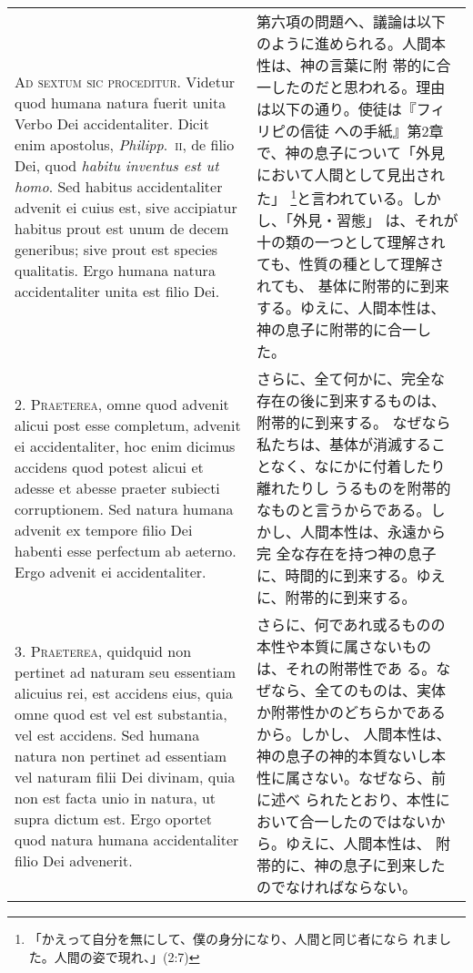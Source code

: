 \documentclass[10pt]{jsarticle} %
\begin{document}
\begin{longtable}{p{21em}p{21em}}
{\scshape Ad sextum sic proceditur}. Videtur quod humana natura fuerit
unita Verbo Dei accidentaliter. Dicit enim apostolus, {\itshape
Philipp}.~{\scshape ii}, de filio Dei, quod {\itshape habitu inventus
est ut homo}. Sed habitus accidentaliter advenit ei cuius est, sive
accipiatur habitus prout est unum de decem generibus; sive prout est
species qualitatis. Ergo humana natura accidentaliter unita est filio
Dei.

&

第六項の問題へ、議論は以下のように進められる。人間本性は、神の言葉に附
帯的に合一したのだと思われる。理由は以下の通り。使徒は『フィリピの信徒
への手紙』第2章で、神の息子について「外見において人間として見出された」
\footnote{「かえって自分を無にして、僕の身分になり、人間と同じ者になら
れました。人間の姿で現れ、」(2:7)}と言われている。しかし、「外見・習態」
は、それが十の類の一つとして理解されても、性質の種として理解されても、
基体に附帯的に到来する。ゆえに、人間本性は、神の息子に附帯的に合一した。

\\



2. {\scshape Praeterea}, omne quod advenit alicui post esse completum,
advenit ei accidentaliter, hoc enim dicimus accidens quod potest
alicui et adesse et abesse praeter subiecti corruptionem. Sed natura
humana advenit ex tempore filio Dei habenti esse perfectum ab
aeterno. Ergo advenit ei accidentaliter.

&


さらに、全て何かに、完全な存在の後に到来するものは、附帯的に到来する。
なぜなら私たちは、基体が消滅することなく、なにかに付着したり離れたりし
うるものを附帯的なものと言うからである。しかし、人間本性は、永遠から完
全な存在を持つ神の息子に、時間的に到来する。ゆえに、附帯的に到来する。

\\



3. {\scshape Praeterea}, quidquid non pertinet ad naturam seu
essentiam alicuius rei, est accidens eius, quia omne quod est vel est
substantia, vel est accidens. Sed humana natura non pertinet ad
essentiam vel naturam filii Dei divinam, quia non est facta unio in
natura, ut supra dictum est. Ergo oportet quod natura humana
accidentaliter filio Dei advenerit.

&

さらに、何であれ或るものの本性や本質に属さないものは、それの附帯性であ
る。なぜなら、全てのものは、実体か附帯性かのどちらかであるから。しかし、
人間本性は、神の息子の神的本質ないし本性に属さない。なぜなら、前に述べ
られたとおり、本性において合一したのではないから。ゆえに、人間本性は、
附帯的に、神の息子に到来したのでなければならない。


\end{longtable}
\end{document}
